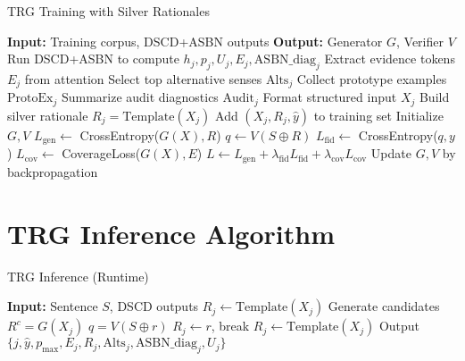 \documentclass[a4paper,11pt]{article}
\begin{document}
\begin{algorithm}[H]
\caption{TRG Training with Silver Rationales}
\begin{algorithmic}[1]
\STATE \textbf{Input:} Training corpus, DSCD+ASBN outputs
\STATE \textbf{Output:} Generator $G$, Verifier $V$
\STATE Run DSCD+ASBN to compute $h_j, p_j, U_j, E_j, \text{ASBN\_diag}_j$
    \STATE Extract evidence tokens $E_j$ from attention
    \STATE Select top alternative senses $\text{Alts}_j$
    \STATE Collect prototype examples $\text{ProtoEx}_j$
    \STATE Summarize audit diagnostics $\text{Audit}_j$
    \STATE Format structured input $X_j$
    \STATE Build silver rationale $R_j = \text{Template}(X_j)$
    \STATE Add $(X_j, R_j, \hat{y})$ to training set
\ENDFOR
\STATE Initialize $G, V$
        \STATE $L_{\text{gen}} \gets$ CrossEntropy($G(X), R$)
        \STATE $q \gets V(S \oplus R)$
        \STATE $L_{\text{fid}} \gets$ CrossEntropy($q, y$)
        \STATE $L_{\text{cov}} \gets$ CoverageLoss($G(X), E$)
        \STATE $L \gets L_{\text{gen}} + \lambda_{\text{fid}} L_{\text{fid}} + \lambda_{\text{cov}} L_{\text{cov}}$
        \STATE Update $G, V$ by backpropagation
    \ENDFOR
\ENDFOR
\end{algorithmic}
\end{algorithm}

\section{TRG Inference Algorithm}

\begin{algorithm}[H]
\caption{TRG Inference (Runtime)}
\begin{algorithmic}[1]
\STATE \textbf{Input:} Sentence $S$, DSCD outputs
        \STATE $R_j \gets \text{Template}(X_j)$
    \ELSE
        \STATE Generate candidates $R^c = G(X_j)$
            \STATE $q = V(S \oplus r)$
                \STATE $R_j \gets r$, break
            \ENDIF
        \ENDFOR
            \STATE $R_j \gets \text{Template}(X_j)$
        \ENDIF
    \ENDIF
    \STATE Output $\{j, \hat{y}, p_{\max}, E_j, R_j, \text{Alts}_j, \text{ASBN\_diag}_j, U_j\}$
\ENDFOR
\end{algorithmic}
\end{algorithm}
\end{document}
